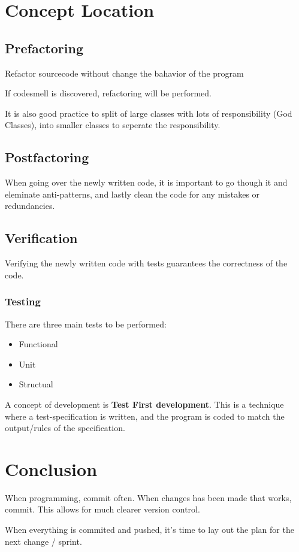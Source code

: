 \section{Concept Location}

\subsection{Prefactoring}
\begin{flushleft}
Refactor sourcecode without change the bahavior of the program
\end{flushleft}

\begin{flushleft}
If codesmell is discovered, refactoring will be performed.
\end{flushleft}

\begin{flushleft}
	It is also good practice to split of large classes with lots of responsibility (God Classes), into smaller classes to seperate the responsibility.
\end{flushleft}

\subsection{Postfactoring}
\begin{flushleft}
When going over the newly written code, it is important to go though it and eleminate anti-patterns, and lastly clean the code for any mistakes or redundancies.
\end{flushleft}

\subsection{Verification}
\begin{flushleft}
Verifying the newly written code with tests guarantees the correctness of the code.

\subsubsection{Testing}
There are three main tests to be performed:
\begin{itemize}
	\item Functional
	\item Unit
	\item Structual
\end{itemize}

A concept of development is \textbf{Test First development}. This is a technique where a test-specification is written, and the program is coded to match the output/rules of the specification.
\end{flushleft}

\section{Conclusion}
\begin{flushleft}
When programming, commit often. When changes has been made that works, commit. This allows for much clearer version control.

When everything is commited and pushed, it's time to lay out the plan for the next change / sprint.
\end{flushleft}
